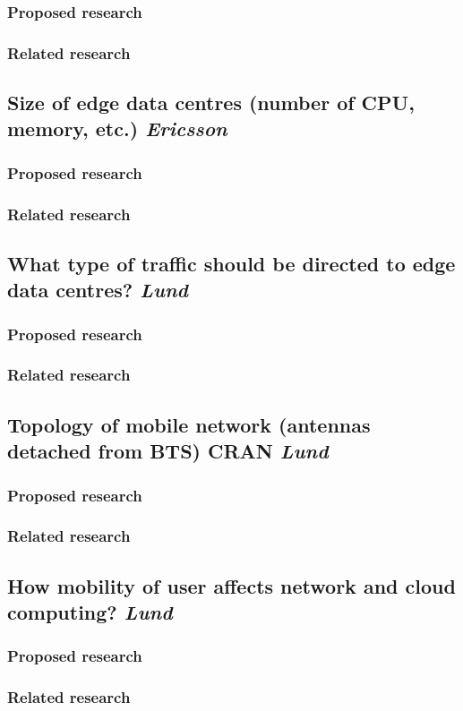 \subsubsection{Proposed research}
\subsubsection{Related research}


\subsection{Size of edge data centres (number of CPU, memory, etc.) \emph{Ericsson}}
\subsubsection{Proposed research}
\subsubsection{Related research}


\subsection{What type of traffic should be directed to edge data centres? \emph{Lund}}
\subsubsection{Proposed research}
\subsubsection{Related research}


\subsection{Topology of mobile network (antennas detached from BTS) CRAN \emph{Lund}}
\subsubsection{Proposed research}
\subsubsection{Related research}


\subsection{How mobility of user affects network and cloud computing? \emph{Lund}}
\subsubsection{Proposed research}
\subsubsection{Related research}
